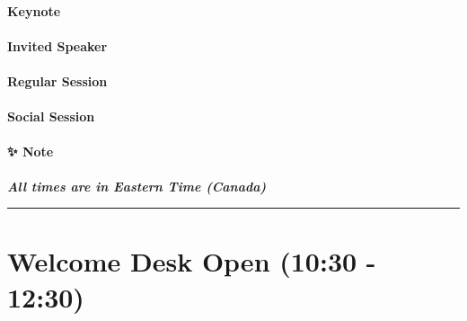 \documentclass[
]{book}
\begin{document}
\begin{reflect}
\hypertarget{keynote}{%
\paragraph{Keynote}\label{keynote}}
\end{reflect}

\begin{wp}
\hypertarget{invited-speaker}{%
\paragraph{Invited Speaker}\label{invited-speaker}}
\end{wp}

\begin{secondary}
\hypertarget{regular-session}{%
\paragraph{Regular Session}\label{regular-session}}
\end{secondary}

\begin{gh}
\hypertarget{social-session}{%
\paragraph{Social Session}\label{social-session}}
\end{gh}

\begin{protip}
\hypertarget{note}{%
\paragraph*{✨ Note}\label{note}}

\textbf{\emph{All times are in Eastern Time (Canada)}}
\end{protip}

\begin{center}\rule{0.5\linewidth}{0.5pt}\end{center}

\hypertarget{welcome-desk-open-1030---1230-4}{%
\section*{Welcome Desk Open (10:30 - 12:30)}\label{welcome-desk-open-1030---1230-4}}
\end{document}
